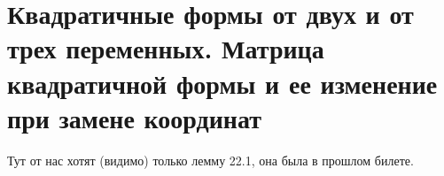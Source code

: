 \section{Квадратичные формы от двух и от трех переменных. Матрица квадратичной формы и ее изменение при замене координат}

Тут от нас хотят (видимо) только лемму 22.1, она была в прошлом билете.


